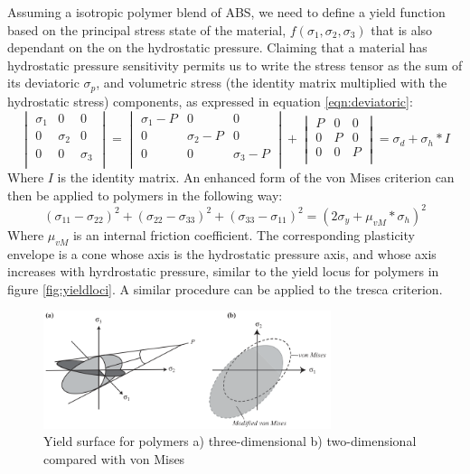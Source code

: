 Assuming a isotropic polymer blend of ABS, we need to define a yield function based on the principal stress state of the material, $f(\sigma_1,\sigma_2,\sigma_3)$ that is also dependant on the on the hydrostatic pressure. 
Claiming that a material has hydrostatic pressure sensitivity permits us to write the stress tensor as the sum of its deviatoric $\sigma_p$, and volumetric stress (the identity matrix multiplied with the hydrostatic stress) components, as expressed in equation \ref{eqn:deviatoric}:
\begin{equation}\label{eqn:deviatoric}
\begin{vmatrix}
\sigma_{1}&0&0\\
0&\sigma_{2}&0\\
0&0&\sigma_{3}\\
\end{vmatrix}
=
\begin{vmatrix}
\sigma_{1}-P&0&0\\
0&\sigma_{2}-P&0\\
0&0&\sigma_{3}-P\\
\end{vmatrix}
+
\begin{vmatrix}
P&0&0\\
0&P&0\\
0&0&P\\
\end{vmatrix}
= \sigma_d+\sigma_h*I
\end{equation}Where $I$ is the identity matrix.  
An enhanced form of the von Mises criterion can then be applied to polymers in the following way:
\begin{equation} \label{eqn:yieldpolymers}
  (\sigma_{11}-\sigma_{22})^2+(\sigma_{22}-\sigma_{33})^2+(\sigma_{33}-\sigma_{11})^2=(2\sigma_y+\mu_{vM}*\sigma_h)^2
\end{equation}
Where $\mu_{vM}$ is an internal friction coefficient. The corresponding plasticity envelope is a cone whose axis is the hydrostatic pressure axis, and whose axis increases with hyrdrostatic pressure, similar to the yield locus for polymers in figure \ref{fig:yieldloci}. A similar procedure can be applied to the tresca criterion. 

\begin{figure}[H]
    \centering
    \includegraphics[width=0.75\textwidth]{chapter_2/figures/yieldpolymers.png}
    \caption{Yield surface for polymers a) three-dimensional b) two-dimensional compared with von Mises \cite{Halary2011PolymerMaterials} }
    \label{fig:Midplane}
\end{figure}

